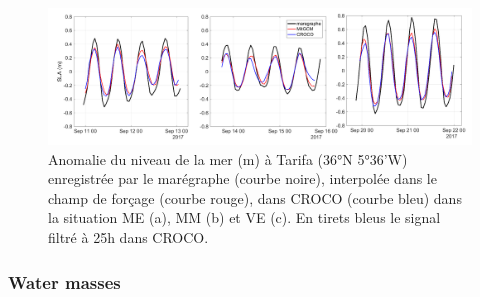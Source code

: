 




\begin{figure}[!h]
        \includegraphics[width=\textwidth]{./GBR3D/SLA_Tarifa_ME2VE2IES.png}
        \caption{Anomalie du niveau de la mer (m) à Tarifa (36°N 5°36'W) enregistrée par le marégraphe  (courbe noire),
        interpolée dans le champ de forçage (courbe rouge), dans CROCO (courbe bleu) dans la situation ME (a), MM (b) et VE (c).
        En tirets bleus le signal filtré à 25h dans CROCO.}
        \label{fig_maree_tar}
\end{figure}

\subsubsection{Water masses}


